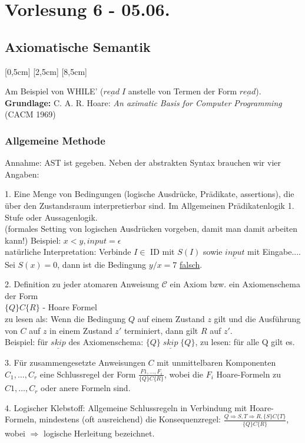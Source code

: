 \section{Vorlesung 6 - 05.06.}
\subsection{Axiomatische Semantik}
[0,5cm]
[2,5cm]
[8,5cm]


Am Beispiel von WHILE' ($\underline{read}\;I$ anstelle von Termen der Form $\underline{read}$).\\
\textbf{Grundlage:} C. A. R. Hoare: \emph{An aximatic Basis for Computer Programming} (CACM 1969)
\subsubsection{Allgemeine Methode}
Annahme: AST ist gegeben.
Neben der abstrakten Syntax brauchen wir vier Angaben:
\begin{compactitem}
	\item[1.] Eine Menge von Bedingungen (logische Ausdrücke, Prädikate, assertions), die über den Zustandsraum interpretierbar sind. Im Allgemeinen Prädikatenlogik 1. Stufe oder Aussagenlogik.\\
	(formales Setting von logischen Ausdrücken vorgeben, damit man damit arbeiten kann!)
	Beispiel: $x < y, input = \epsilon$\\ %
	natürliche Interpretation: Verbinde $I \in$ ID mit $S(I)$ sowie $\underline{input}$ mit Eingabe....\\
	Sei $S(x)=0$, dann ist die Bedingung $y/x=7$ \underline{falsch}.
	\item[2.] Definition zu jeder atomaren Anweisung $\mathcal{C}$ ein Axiom bzw. ein Axiomenschema der Form\\
	$\{Q\}C\{R\}$ - Hoare Formel\\
	zu lesen als: Wenn die Bedingung $Q$ auf einem Zustand $z$ gilt und die Ausführung von $C$ auf $z$ in einem Zustand $z'$ terminiert, dann gilt $R$ auf $z'$.\\
	Beispiel: für $\underline{skip}$ des Axiomenschema: $\{Q\}\;\underline{skip}\;\{Q\}$, zu lesen: für alle Q gilt es.
	\item[3.] Für zusammengesetzte Anweisungen $C$ mit unmittelbaren Komponenten $C_1,\dots,C_r$ eine Schlussregel der Form $\frac{F1,\dots,F_i}{\{Q\}C\{R\}}$, wobei die $F_i$ Hoare-Formeln zu $C1, \dots, C_r$ oder anere Formeln sind.\\
	\item[4.] Logischer Klebstoff: Allgemeine Schlussregeln in Verbindung mit Hoare-Formeln, mindestens (oft ausreichend) die Konsequenzregel: $\frac{Q\Rightarrow S, T \Rightarrow R, \{S\}C\{T\}}{\{Q\}C\{R\}}$, wobei $\Rightarrow$ logische Herleitung bezeichnet.\\
\end{compactitem}
